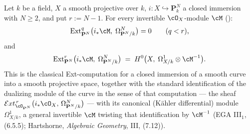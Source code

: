 \begin{lemma}
\label{lem:pc-omega-identity}
Let $k$ be a field, $X$ a smooth projective 
over $k$, $i:X\hookrightarrow\mathbf P^N_k$ a closed immersion with
$N\ge2$, and put $r:=N-1$.  For every invertible $\cO_X$-module
$\cM$ ():
\[
\operatorname{Ext}^{q}_{\mathbf P^N}\bigl(i_*\cM,\;
\Omega_{\mathbf P^N/k}^{N}\bigr)=0\qquad(q<r),
\]
and
\[
\operatorname{Ext}^{r}_{\mathbf P^N}\bigl(i_*\cM,\;
\Omega_{\mathbf P^N/k}^{N}\bigr)
\;=\;H^0\bigl(X,\;\Omega^1_{X/k}\otimes\cM^{-1}\bigr).
\]
This is the classical Ext-computation for a closed immersion of a
smooth curve into a smooth projective space, together with the
standard identification of the dualizing module of the curve in the
sense of that computation --- the sheaf
$\mathcal{E}xt^{\,r}_{\cO_{\mathbf P^N}}\bigl(i_*\cO_X,\,
\Omega_{\mathbf P^N/k}^{N}\bigr)$ --- with its canonical (Kähler
differential) module $\Omega^1_{X/k}$, a general invertible $\cM$
twisting that identification by $\cM^{-1}$
(EGA III$_1$, \,(6.5.5); Hartshorne, \emph{Algebraic Geometry}, III,
(7.12)).
\end{lemma}
